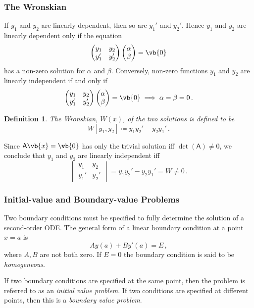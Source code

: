 \documentclass{article}
\theoremstyle{plain}\theoremheaderfont{\normalfont\itshape}\theorembodyfont{\rmfamily}\theoremseparator{.}\newtheorem*{rem}{Remark}\newtheorem*{ex}{Example}\newtheorem*{proof}{Proof}\newtheorem*{altp}{Alternative proof}
\theoremstyle{plain}\theoremheaderfont{\normalfont\bfseries}\theorembodyfont{\rmfamily}\theoremseparator{.}\newtheorem{thm}{Theorem}[section]\newtheorem{lem}[thm]{Lemma}\newtheorem{prop}[thm]{Proposition}\newtheorem*{cor}{Corollary}\newtheorem{defn}[thm]{Definition}\newtheorem{clm}[thm]{Claim}\newtheorem{clminproof}{Claim}
\theoremstyle{break}\theoremheaderfont{\normalfont\itshape}\theorembodyfont{\rmfamily}\theoremseparator{.\medskip}\newtheorem*{proofskip}{Proof}\newtheorem*{exs}{Examples}\newtheorem*{rems}{Remarks}
\theoremstyle{break}\theoremheaderfont{\normalfont\bfseries}\theorembodyfont{\rmfamily}\theoremseparator{.\medskip}\newtheorem{lemskip}[thm]{Lemma}\newtheorem{defnskip}[thm]{Definition}\newtheorem{propskip}[thm]{Proposition}\newtheorem{thmskip}[thm]{Theorem}
\numberwithin{equation}{section}
\begin{document}
	\subsubsection{The Wronskian}
	If \(y_1\) and \(y_2\) are linearly dependent, then so are \(y_1'\) and \(y_2'\). Hence \(y_1\) and \(y_2\) are linearly dependent only if the equation
	\[\begin{pmatrix}
		y_1 & y_2\\
		y_1' & y_2'
	\end{pmatrix}
	\begin{pmatrix}
		\alpha\\
		\beta
	\end{pmatrix}=\vb{0}\]
	has a non-zero solution for \(\alpha\) and \(\beta\). Conversely, non-zero functions \(y_1\) and \(y_2\) are linearly independent if and only if
	\[\begin{pmatrix}
		y_1 & y_2\\
		y_1' & y_2'
	\end{pmatrix}
	\begin{pmatrix}
		\alpha\\
		\beta
	\end{pmatrix}=\vb{0}\implies\alpha=\beta=0\,.\]
	
	\begin{defn}
		The \textit{Wronskian}, \(W(x)\), of the two solutions is defined to be
		\[W[y_1,y_2]\coloneqq y_1y_2'-y_2y_1'\,.\]
	\end{defn}
	Since \(\mathsf{A}\vb{x}=\vb{0}\) has only the trivial solution iff \(\det(\mathsf{A})\ne 0\), we conclude that \(y_1\) and \(y_2\) are linearly independent iff
	\[\begin{vmatrix}
		y_1 & y_2\\
		y_1' & y_2'
	\end{vmatrix}=y_1y_2'-y_2y_1'=W\ne0\,.\]
	
	\subsubsection{Initial-value and Boundary-value Problems}
	Two boundary conditions must be specified to fully determine the solution of a second-order ODE. The general form of a linear boundary condition at a point \(x=a\) is
	\[Ay(a)+By'(a)=E\,,\]
	where \(A, B\) are not both zero. If \(E=0\) the boundary condition is said to be \textit{homogeneous}.

	If two boundary conditions are specified at the same point, then the problem is referred to as an \textit{initial value problem}. If two conditions are specified at different points, then this is a \textit{boundary value problem}.
	
\end{document}
